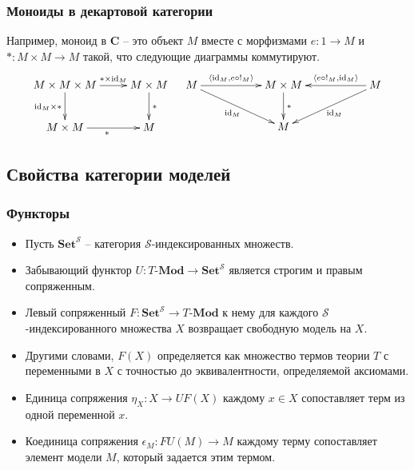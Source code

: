 \documentclass{beamer}
\theoremstyle{definition}
\newcommand{\cat}[1]{\mathbf{#1}}
\renewcommand{\C}{\cat{C}}
\newcommand{\Set}{\cat{Set}}
\newcommand{\Mod}[1]{#1\text{-}\cat{Mod}}
\newcommand{\fs}[1]{\mathrm{#1}}
\newcommand{\id}{\fs{id}}
\begin{document}
\begin{frame}
\frametitle{Моноиды в декартовой категории}
Например, моноид в $\C$ -- это объект $M$ вместе с морфизмами $e : 1 \to M$ и $* : M \times M \to M$ такой, что следующие диаграммы коммутируют.
\[ \xymatrix{ M \times M \times M \ar[r]^-{* \times \id_M} \ar[d]_{\id_M \times *} & M \times M \ar[d]^{*} \\
              M \times M \ar[r]_{*}                                                & M
            }
\quad
   \xymatrix{ M \ar[rr]^-{\langle \id_M, e \circ !_M \rangle} \ar[rrd]_{\id_M} & & M \times M \ar[d]^{*} & & M \ar[ll]_-{\langle e \circ !_M, \id_M \rangle} \ar[dll]^{\id_M} \\
                                                                               & & M
            } \]
\end{frame}

\subsection{Свойства категории моделей}

\begin{frame}
\frametitle{Функторы}
\begin{itemize}
\item Пусть $\Set^\mathcal{S}$ -- категория $\mathcal{S}$-индексированных множеств.
\item Забывающий функтор $U : \Mod{T} \to \Set^\mathcal{S}$ является строгим и правым сопряженным.
\item Левый сопряженный $F : \Set^\mathcal{S} \to \Mod{T}$ к нему для каждого $\mathcal{S}$-индексированного множества $X$ возвращает свободную модель на $X$.
\item Другими словами, $F(X)$ определяется как множество термов теории $T$ с переменными в $X$ с точностью до эквивалентности, определяемой аксиомами.
\item Единица сопряжения $\eta_X : X \to U F(X)$ каждому $x \in X$ сопоставляет терм из одной переменной $x$.
\item Коединица сопряжения $\epsilon_M : F U(M) \to M$ каждому терму сопоставляет элемент модели $M$, который задается этим термом.
\end{itemize}
\end{frame}
\end{document}

